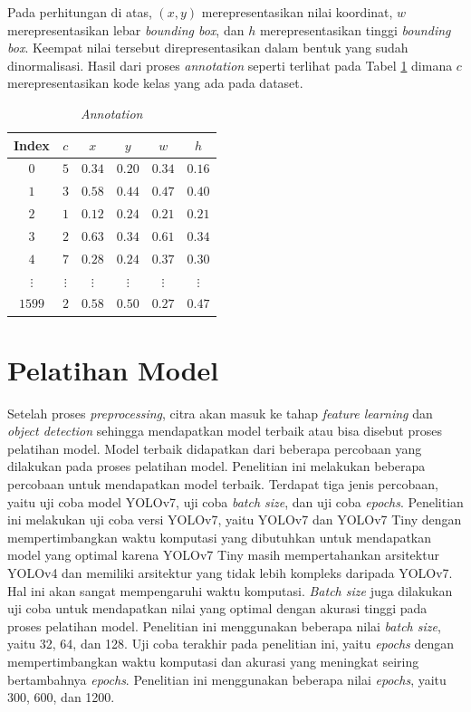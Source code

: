     Pada perhitungan di atas, $(x, y)$ merepresentasikan nilai koordinat, $w$ merepresentasikan lebar \textit{bounding box}, dan $h$ merepresentasikan tinggi \textit{bounding box}. Keempat nilai tersebut direpresentasikan dalam bentuk yang sudah dinormalisasi. Hasil dari proses \textit{annotation} seperti terlihat pada Tabel \ref{tab:d-annotation} dimana $c$ merepresentasikan kode kelas yang ada pada dataset.

    \begin{table}[H]
        \caption{\textit{Annotation}}
        \centering
        \begin{tabular}{cccccc}
            \hline
            Index       &$c$        &$x$        &$y$        &$w$        &$h$ \\ \hline
            $0$         &$5$        &$0.34$     &$0.20$     &$0.34$     &$0.16$ \\ \hline
            $1$         &$3$        &$0.58$     &$0.44$     &$0.47$     &$0.40$ \\ \hline
            $2$         &$1$        &$0.12$     &$0.24$     &$0.21$     &$0.21$ \\ \hline
            $3$         &$2$        &$0.63$     &$0.34$     &$0.61$     &$0.34$ \\ \hline
            $4$         &$7$        &$0.28$     &$0.24$     &$0.37$     &$0.30$ \\ \hline
            $\vdots$    &$\vdots$   &$\vdots$   &$\vdots$   &$\vdots$   &$\vdots$ \\ \hline
            $1599$      &$2$        &$0.58$     &$0.50$     &$0.27$     &$0.47$ \\ \hline
        \end{tabular}
        \label{tab:d-annotation}
    \end{table}

\section{Pelatihan Model}
Setelah proses \textit{preprocessing}, citra akan masuk ke tahap \textit{feature learning} dan \textit{object detection} sehingga mendapatkan model terbaik atau bisa disebut proses pelatihan model. Model terbaik didapatkan dari beberapa percobaan yang dilakukan pada proses pelatihan model. Penelitian ini melakukan beberapa percobaan untuk mendapatkan model terbaik. Terdapat tiga jenis percobaan, yaitu uji coba model YOLOv7, uji coba \textit{batch size}, dan uji coba \textit{epochs}. Penelitian ini melakukan uji coba versi YOLOv7, yaitu YOLOv7 dan YOLOv7 Tiny dengan mempertimbangkan waktu komputasi yang dibutuhkan untuk mendapatkan model yang optimal karena YOLOv7 Tiny masih mempertahankan arsitektur YOLOv4 dan memiliki arsitektur yang tidak lebih kompleks daripada YOLOv7. Hal ini akan sangat mempengaruhi waktu komputasi. \textit{Batch size} juga dilakukan uji coba untuk mendapatkan nilai yang optimal dengan akurasi tinggi pada proses pelatihan model. Penelitian ini menggunakan beberapa nilai \textit{batch size}, yaitu 32, 64, dan 128. Uji coba terakhir pada penelitian ini, yaitu \textit{epochs} dengan mempertimbangkan waktu komputasi dan akurasi yang meningkat seiring bertambahnya \textit{epochs}. Penelitian ini menggunakan beberapa nilai \textit{epochs}, yaitu 300, 600, dan 1200.
